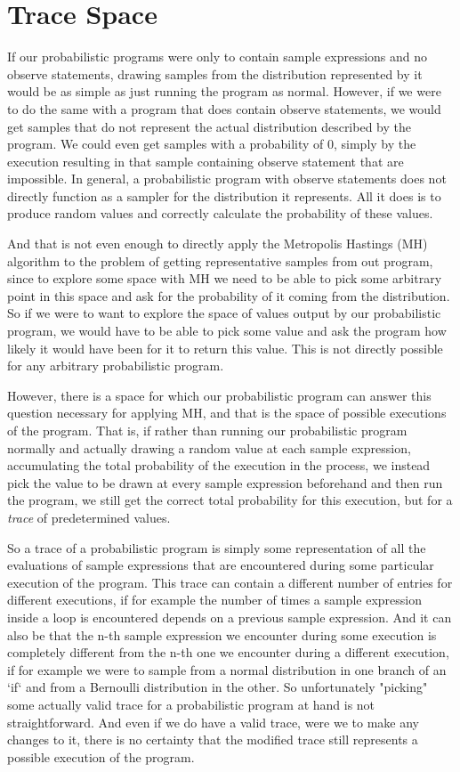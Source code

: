 \section{Trace Space}

If our probabilistic programs were only to contain sample expressions and no observe statements, drawing samples from the distribution represented by it would be as simple as just running the program as normal. However, if we were to do the same with a program that does contain observe statements, we would get samples that do not represent the actual distribution described by the program. We could even get samples with a probability of $0$, simply by the execution resulting in that sample containing observe statement that are impossible. In general, a probabilistic program with observe statements does not directly function as a sampler for the distribution it represents. All it does is to produce random values and correctly calculate the probability of these values.

And that is not even enough to directly apply the Metropolis Hastings (MH) algorithm to the problem of getting representative samples from out program, since to explore some space with MH we need to be able to pick some arbitrary point in this space and ask for the probability of it coming from the distribution. So if we were to want to explore the space of values output by our probabilistic program, we would have to be able to pick some value and ask the program how likely it would have been for it to return this value. This is not directly possible for any arbitrary probabilistic program.

However, there is a space for which our probabilistic program can answer this question necessary for applying MH, and that is the space of possible executions of the program. That is, if rather than running our probabilistic program normally and actually drawing a random value at each sample expression, accumulating the total probability of the execution in the process, we instead pick the value to be drawn at every sample expression beforehand and then run the program, we still get the correct total probability for this execution, but for a \textit{trace} of predetermined values.

So a trace of a probabilistic program is simply some representation of all the evaluations of sample expressions that are encountered during some particular execution of the program. This trace can contain a different number of entries for different executions, if for example the number of times a sample expression inside a loop is encountered depends on a previous sample expression. And it can also be that the n-th sample expression we encounter during some execution is completely different from the n-th one we encounter during a different execution, if for example we were to sample from a normal distribution in one branch of an `if` and from a Bernoulli distribution in the other. So unfortunately "picking" some actually valid trace for a probabilistic program at hand is not straightforward. And even if we do have a valid trace, were we to make any changes to it, there is no certainty that the modified trace still represents a possible execution of the program.

